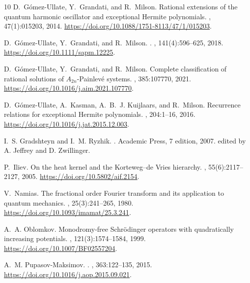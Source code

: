 \documentclass[12pt]{article}
\begin{document}
\begin{thebibliography}{10}
D.~G\'omez-Ullate, Y.~Grandati, and R.~Milson.
\newblock Rational extensions of the quantum harmonic oscillator and
  exceptional {H}ermite polynomials.
,
  47(1):015203, 2014.
\newblock \url{https://doi.org/10.1088/1751-8113/47/1/015203}.

D.~G\'omez-Ullate, Y.~Grandati, and R.~Milson.
.
, 141(4):596--625, 2018.
\newblock \url{https://doi.org/10.1111/sapm.12225}.

D.~G{\'o}mez-Ullate, Y.~Grandati, and R.~Milson.
\newblock Complete classification of rational solutions of
  {$A_{2n}$}-{Painlev{\'e}} systems.
, 385:107770, 2021.
\newblock \url{https://doi.org/10.1016/j.aim.2021.107770}.

D.~G{\'o}mez-Ullate, A.~Kasman, A.~B.~J. Kuijlaars, and R.~Milson.
\newblock Recurrence relations for exceptional {Hermite} polynomials.
, 204:1--16, 2016.
\newblock \url{https://doi.org/10.1016/j.jat.2015.12.003}.

I.~S. Gradshteyn and I.~M. Ryzhik.
.
\newblock Academic Press, 7 edition, 2007.
\newblock edited by A. Jeffrey and D. Zwillinger.

P.~Iliev.
\newblock On the heat kernel and the {Korteweg--de Vries} hierarchy.
, 55(6):2117--2127, 2005.
\newblock \url{https://doi.org/10.5802/aif.2154}.

V.~Namias.
\newblock The fractional order {Fourier} transform and its application to
  quantum mechanics.
, 25(3):241--265, 1980.
\newblock \url{https://doi.org/10.1093/imamat/25.3.241}.

A.~A. Oblomkov.
\newblock Monodromy-free {Schr{\"o}dinger} operators with quadratically
  increasing potentials.
, 121(3):1574--1584, 1999.
\newblock \url{https://doi.org/10.1007/BF02557204}.

A.~M. Pupasov-Maksimov.
.
, 363:122--135, 2015.
\newblock \url{https://doi.org/10.1016/j.aop.2015.09.021}.


\end{thebibliography}
\end{document}
